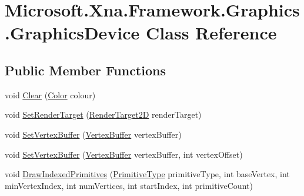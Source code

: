 \hypertarget{class_microsoft_1_1_xna_1_1_framework_1_1_graphics_1_1_graphics_device}{}\section{Microsoft.\+Xna.\+Framework.\+Graphics.\+Graphics\+Device Class Reference}
\label{class_microsoft_1_1_xna_1_1_framework_1_1_graphics_1_1_graphics_device}
\subsection*{Public Member Functions}
\begin{DoxyCompactItemize}
\item 
void \hyperlink{class_microsoft_1_1_xna_1_1_framework_1_1_graphics_1_1_graphics_device_a37fa5e139b31dc7ca91c3c6cf2da8f64}{Clear} (\hyperlink{struct_microsoft_1_1_xna_1_1_framework_1_1_color}{Color} colour)
\item 
void \hyperlink{class_microsoft_1_1_xna_1_1_framework_1_1_graphics_1_1_graphics_device_a1ab0f5a16a4a7df740159adce772ce42}{Set\+Render\+Target} (\hyperlink{class_microsoft_1_1_xna_1_1_framework_1_1_graphics_1_1_render_target2_d}{Render\+Target2\+D} render\+Target)
\item 
void \hyperlink{class_microsoft_1_1_xna_1_1_framework_1_1_graphics_1_1_graphics_device_ab70253a45aaeeda03ba627d004ec5e5f}{Set\+Vertex\+Buffer} (\hyperlink{class_microsoft_1_1_xna_1_1_framework_1_1_graphics_1_1_vertex_buffer}{Vertex\+Buffer} vertex\+Buffer)
\item 
void \hyperlink{class_microsoft_1_1_xna_1_1_framework_1_1_graphics_1_1_graphics_device_a47c1205894cd5698c74fa62b309dc886}{Set\+Vertex\+Buffer} (\hyperlink{class_microsoft_1_1_xna_1_1_framework_1_1_graphics_1_1_vertex_buffer}{Vertex\+Buffer} vertex\+Buffer, int vertex\+Offset)
\item 
void \hyperlink{class_microsoft_1_1_xna_1_1_framework_1_1_graphics_1_1_graphics_device_aeebed168f03472f4ab96d0d41696943c}{Draw\+Indexed\+Primitives} (\hyperlink{namespace_microsoft_1_1_xna_1_1_framework_1_1_graphics_a3fe9d125b507188d27a5a40c6b2cd70f}{Primitive\+Type} primitive\+Type, int base\+Vertex, int min\+Vertex\+Index, int num\+Vertices, int start\+Index, int primitive\+Count)
\end{DoxyCompactItemize}
